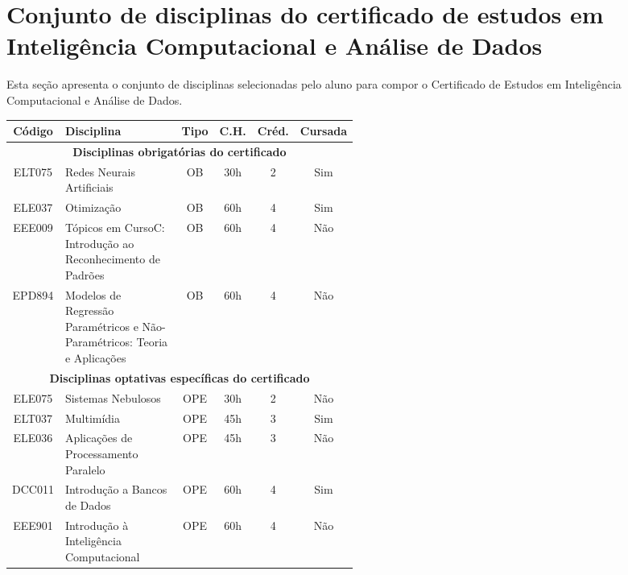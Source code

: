 \documentclass{article}
\newcommand{\curso}{Curso} %
\begin{document}
	\section{Conjunto de disciplinas do certificado de estudos em Inteligência Computacional e Análise de Dados} \label{sec:Conj}
	Esta seção apresenta o conjunto de disciplinas selecionadas pelo aluno para compor o Certificado de Estudos em Inteligência Computacional e Análise de Dados.
	
	\begin{table}[H]
		\centering
		\begin{tabular}{|c|p{0.5\linewidth}|c|c|c|c|}\hline
			\textbf{Código} & \textbf{Disciplina} & \textbf{Tipo} & \textbf{C.H.} & \textbf{Créd.} & \textbf{Cursada} \\ \hline
			\multicolumn{6}{|c|}{\textbf{Disciplinas obrigatórias do certificado}} \\ \hline
			ELT075 & Redes Neurais Artificiais & OB & 30h & 2 & Sim \\ \hline
			ELE037 & Otimização & OB & 60h & 4 & Sim \\ \hline
			EEE009 & Tópicos em \curso C: Introdução ao Reconhecimento de Padrões & OB & 60h & 4 & Não \\ \hline
			EPD894 & Modelos de Regressão Paramétricos e Não-Paramétricos: Teoria e Aplicações & OB & 60h & 4 & Não\\ \hline
			\multicolumn{6}{|c|}{\textbf{Disciplinas optativas específicas do certificado}} \\ \hline
			ELE075 & Sistemas Nebulosos & OPE & 30h & 2 & Não \\ \hline
			ELT037 & Multimídia & OPE & 45h & 3 & Sim \\ \hline
			ELE036 & Aplicações de Processamento Paralelo & OPE & 45h & 3 & Não \\ \hline
			DCC011 & Introdução a Bancos de Dados & OPE & 60h & 4 & Sim \\ \hline
			EEE901 & Introdução à Inteligência Computacional & OPE & 60h & 4 & Não \\ \hline

\end{tabular}
\end{table}
\end{document}
